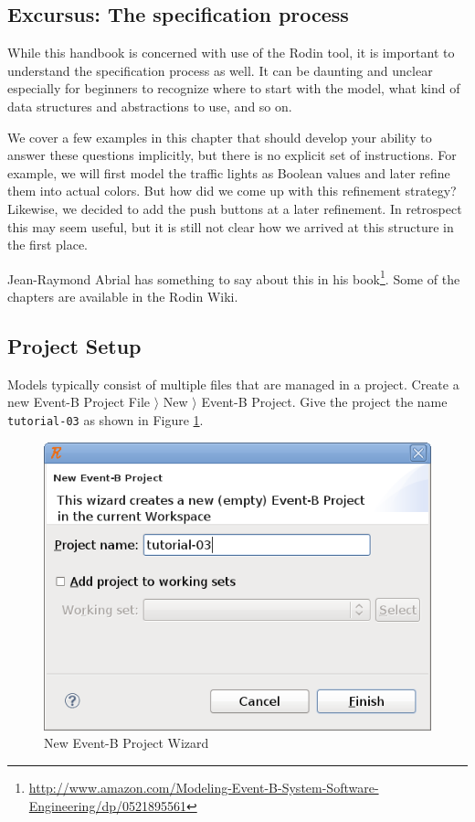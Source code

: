 \subsection{Excursus: The specification process}
\label{tut_excursus_the_sepcification_process}

While this handbook is concerned with use of the Rodin tool, it is important to understand the specification process as well.  It can be daunting and unclear especially for beginners to recognize where to start with the model, what kind of data structures and abstractions to use, and so on.

We cover a few examples in this chapter that should develop your ability to answer these questions implicitly, but there is no explicit set of instructions.  For example, we will first model the traffic lights as Boolean values and later refine them into actual colors.  But how did we come up with this refinement strategy?  Likewise, we decided to add the push buttons at a later refinement.  In retrospect this may seem useful, but it is still not clear how we arrived at this structure in the first place.

Jean-Raymond Abrial has something to say about this in his book\footnote{\url{http://www.amazon.com/Modeling-Event-B-System-Software-Engineering/dp/0521895561}}. Some of the chapters are available in the Rodin Wiki.

\subsection{Project Setup}
\label{tut_project_setup}

Models typically consist of multiple files that are managed in a project.  Create a new Event-B Project \textsf{File $\rangle$ New $\rangle$ Event-B Project}.  Give the project the name \texttt{tutorial-03} as shown in Figure \ref{fig_tut_03_new_project_wizard}.

\begin{figure}[!ht]
\begin{center}
	\includegraphics[]{img/tutorial/tut_03_tutorial-3.png}
	\caption{New Event-B Project Wizard}
	\label{fig_tut_03_new_project_wizard}
\end{center}
\end{figure}

